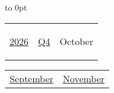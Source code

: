 \vbox to 0pt{}


\pagebreak
{\noindent\Large\renewcommand{\arraystretch}{\myNumArrayStretch}\begin{tabular}{|l|l|l}
\hyperlink{2026}{2026} & \hyperlink{Q4}{Q4} & \hypertarget{October}{October}
\end{tabular}\hfill%
\begin{tabular}{r|r@{}}
\hyperlink{September}{September} & \hyperlink{November}{November}
\end{tabular}}
\myLineThick\medskip

{%

\setlength{\tabcolsep}{\myLenTabColSep}%
%
\begin{tabularx}{\linewidth}{|l!{\vrule width \myLenLineThicknessThick}*{7}{@{}X@{}|}}
  

\end{tabularx}}
